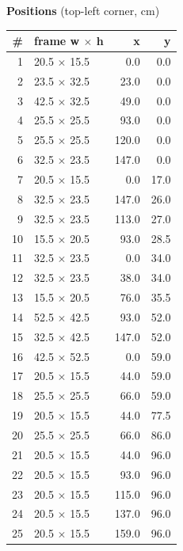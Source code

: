 \documentclass[a4paper,landscape,10pt]{article}
\begin{document}
\begin{minipage}[t]{0.25\textwidth}
\vspace{8pt}
{\bfseries Positions} (top-left corner, cm)\\[2pt]
\tiny
\begin{tabular}{@{}r l r r@{}}
\toprule
\# & frame w $\times$ h & x & y \\
\midrule
1 & 20.5 $\times$ 15.5 & 0.0 & 0.0 \\
2 & 23.5 $\times$ 32.5 & 23.0 & 0.0 \\
3 & 42.5 $\times$ 32.5 & 49.0 & 0.0 \\
4 & 25.5 $\times$ 25.5 & 93.0 & 0.0 \\
5 & 25.5 $\times$ 25.5 & 120.0 & 0.0 \\
6 & 32.5 $\times$ 23.5 & 147.0 & 0.0 \\
7 & 20.5 $\times$ 15.5 & 0.0 & 17.0 \\
8 & 32.5 $\times$ 23.5 & 147.0 & 26.0 \\
9 & 32.5 $\times$ 23.5 & 113.0 & 27.0 \\
10 & 15.5 $\times$ 20.5 & 93.0 & 28.5 \\
11 & 32.5 $\times$ 23.5 & 0.0 & 34.0 \\
12 & 32.5 $\times$ 23.5 & 38.0 & 34.0 \\
13 & 15.5 $\times$ 20.5 & 76.0 & 35.5 \\
14 & 52.5 $\times$ 42.5 & 93.0 & 52.0 \\
15 & 32.5 $\times$ 42.5 & 147.0 & 52.0 \\
16 & 42.5 $\times$ 52.5 & 0.0 & 59.0 \\
17 & 20.5 $\times$ 15.5 & 44.0 & 59.0 \\
18 & 25.5 $\times$ 25.5 & 66.0 & 59.0 \\
19 & 20.5 $\times$ 15.5 & 44.0 & 77.5 \\
20 & 25.5 $\times$ 25.5 & 66.0 & 86.0 \\
21 & 20.5 $\times$ 15.5 & 44.0 & 96.0 \\
22 & 20.5 $\times$ 15.5 & 93.0 & 96.0 \\
23 & 20.5 $\times$ 15.5 & 115.0 & 96.0 \\
24 & 20.5 $\times$ 15.5 & 137.0 & 96.0 \\
25 & 20.5 $\times$ 15.5 & 159.0 & 96.0 \\
\bottomrule
\end{tabular}
\end{minipage}
\clearpage
\end{document}
